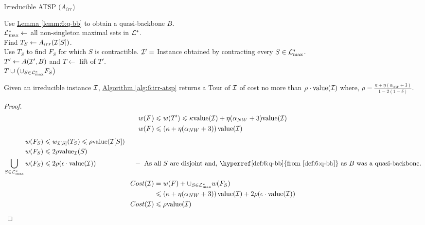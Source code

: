 \documentclass[./main.tex]{subfiles}
\begin{document}
	\begin{algorithm}\label{alg:6:irr-atsp}
		\caption{Irreducible ATSP ($A_{irr}$)}
		Use \hyperref[lemm:6:q-bb]{Lemma \ref{lemm:6:q-bb}} to obtain a quasi-backbone $B$.\\
		$\mathcal{L}^*_{\max} \leftarrow $ all non-singleton maximal sets in $\mathcal{L}^*$.\\
		 {
			Find $T_S \leftarrow A_{irr}(\mathcal{I}[S])$.\\
			Use $T_S$ to find $F_S$ for which $S$ is contractible. 
		}
		$\mathcal{I}' = $ Instance obtained by contracting every $S \in \mathcal{L}^*_{\max}$.\\
		$T' \leftarrow A(\mathcal{I}', B)$ and $T \leftarrow $ lift of $T'$.\\
		\Return $T \cup \left(\cup_{S \in \mathcal{L}^*_{\max}} F_S\right)$
	\end{algorithm}
	
	\begin{theorem}
		Given an irreducible instance $\mathcal{I}$, \hyperref[alg:6:irr-atsp]{Algorithm \ref{alg:6:irr-atsp}} returns a Tour of $\mathcal{I}$ of cost no more than $\rho\cdot\textup{value}(\mathcal{I})$ where, $\rho = \frac{\kappa + \eta(\alpha_{NW} + 3)}{1 - 2(1 - \delta)}$.
	\end{theorem}
	\begin{proof}
		\begin{align*}
			w(F) &\leqslant w(T') \leqslant \kappa\textup{value}(\mathcal{I}) + \eta(\alpha_{NW} + 3)\textup{value}(\mathcal{I}) \\
			w(F) &\leqslant \left(\kappa + \eta(\alpha_{NW} + 3)\right)\textup{value}(\mathcal{I})
		\end{align*}
		\begin{align*}
			w(F_S) &\leqslant w_{\calI[S]}(T_S) \leqslant \rho \val(\calI[S])\\
			w(F_S)&\leqslant 2\rho\val_{\calI}(S)\\
			\bigcup_{S \in \lam^*_{\max}} w(F_S) &\leqslant 2\rho (\epsilon\cdot\val(\calI))  \hspace*{2cm} -  \text{ As all $S$ are disjoint and, \hyperref[def:6:q-bb]{from \ref{def:6:q-bb}} as $B$ was a quasi-backbone.}
		\end{align*}
		\begin{align*}
			Cost(\mathcal{I}) &= w(F) + \cup_{S \in \mathcal{L}^*_{\max}} w(F_S)\\
			&\leqslant \left(\kappa + \eta(\alpha_{NW} + 3)\right)\textup{value}(\mathcal{I}) + 2\rho (\epsilon\cdot \textup{value}(\mathcal{I}))\\
			Cost(\mathcal{I}) &\leqslant \rho\textup{value}(\mathcal{I})
		\end{align*}
		
	\end{proof}
\end{document}
